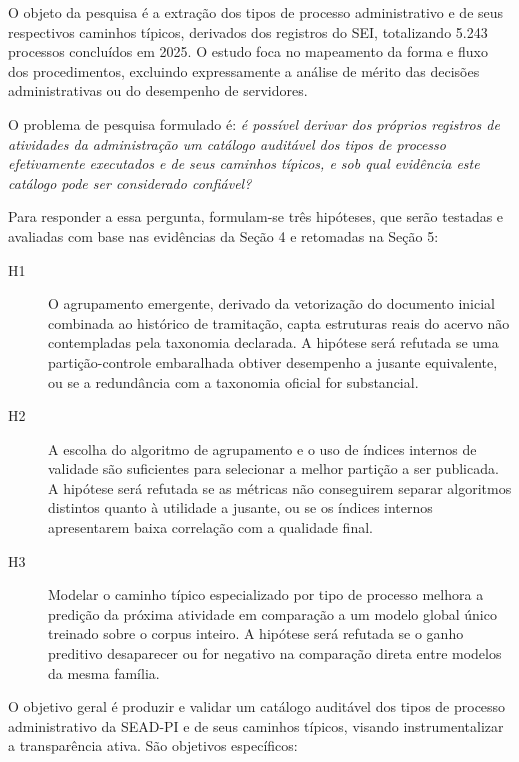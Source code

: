 O objeto da pesquisa é a extração dos tipos de processo administrativo e de seus respectivos caminhos típicos, derivados dos registros do SEI, totalizando 5.243 processos concluídos em 2025. O estudo foca no mapeamento da forma e fluxo dos procedimentos, excluindo expressamente a análise de mérito das decisões administrativas ou do desempenho de servidores.

O problema de pesquisa formulado é: \emph{é possível derivar dos próprios registros de atividades da administração um catálogo auditável dos tipos de processo efetivamente executados e de seus caminhos típicos, e sob qual evidência este catálogo pode ser considerado confiável?}

Para responder a essa pergunta, formulam-se três hipóteses, que serão testadas e avaliadas com base nas evidências da Seção 4 e retomadas na Seção 5:

\begin{description}
  \item[H1] O agrupamento emergente, derivado da vetorização do documento inicial combinada ao histórico de tramitação, capta estruturas reais do acervo não contempladas pela taxonomia declarada. A hipótese será refutada se uma partição-controle embaralhada obtiver desempenho a jusante equivalente, ou se a redundância com a taxonomia oficial for substancial.
  \item[H2] A escolha do algoritmo de agrupamento e o uso de índices internos de validade são suficientes para selecionar a melhor partição a ser publicada. A hipótese será refutada se as métricas não conseguirem separar algoritmos distintos quanto à utilidade a jusante, ou se os índices internos apresentarem baixa correlação com a qualidade final.
  \item[H3] Modelar o caminho típico especializado por tipo de processo melhora a predição da próxima atividade em comparação a um modelo global único treinado sobre o corpus inteiro. A hipótese será refutada se o ganho preditivo desaparecer ou for negativo na comparação direta entre modelos da mesma família.
\end{description}

O objetivo geral é produzir e validar um catálogo auditável dos tipos de processo administrativo da SEAD-PI e de seus caminhos típicos, visando instrumentalizar a transparência ativa. São objetivos específicos:

